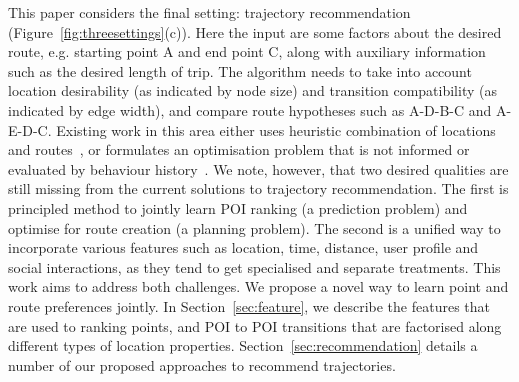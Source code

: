 This paper considers the final setting: trajectory recommendation (Figure~\ref{fig:threesettings}(c)). Here the input are some factors about the desired route, e.g. starting point A and end point C, along with auxiliary information such as the desired length of trip. The algorithm needs to take into account location desirability (as indicated by node size) and transition compatibility (as indicated by edge width), and compare route hypotheses such as A-D-B-C and A-E-D-C. Existing work in this area either uses heuristic combination of locations and routes~\cite{lu2010photo2trip,ijcai15,lu2012personalized}, or formulates an optimisation problem that is not informed or evaluated by behaviour history~\cite{gioniswsdm14,chen2015tripplanner}.
%
We note, however, that two desired qualities are still
missing from the current solutions to trajectory recommendation.
The first is principled method to jointly learn POI ranking (a prediction problem)
and optimise for route creation (a planning problem).
The second is a unified way to incorporate various features
such as location, time, distance, user profile and social interactions,
as they tend to get specialised and separate treatments.
This work aims to address both challenges. %
We propose a novel way to learn point and route preferences jointly.
In Section~\ref{sec:feature}, we describe the features that are used to ranking points,
and POI to POI transitions that are factorised along %
different types of location properties.
Section~\ref{sec:recommendation} details a number of our proposed approaches to recommend trajectories.
